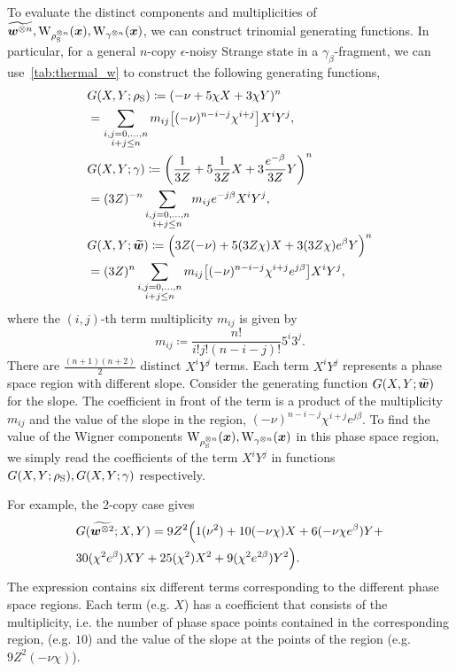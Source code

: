 \documentclass[pra,
aps,
twocolumn,
superscriptaddress,
groupedaddress,
nofootinbib,
reprint
]{revtex4-1}
\begin{document}
To evaluate the distinct components and multiplicities of $\widetilde{\bmw\too{n}}, \W{\noisys\too{n}}(\bmx), \W{\gamma\too{n}}(\bmx)$, we can construct trinomial generating functions.
In particular, for a general $n$-copy $\epsilon$-noisy Strange state in a $\gamma_\beta$-fragment, we can use~\cref{tab:thermal_w} to construct the following generating functions,
\begin{align}
	&G(X,Y; \rho_{\rm{S}}) \coloneqq (-\nu + 5\chi X + 3\chi Y)^n \nonumber\\
	&= \sum\limits_{\substack{i,j = 0,\dots,n \\ i+j \leq n}} m_{ij} \big[(-\nu)^{n-i-j} \chi^{i+j} \big] X^i Y^j, \\
	&G(X,Y; \gamma) \coloneqq \left( \frac{1}{3Z} + 5\frac{1}{3Z} X + 3 \frac{e^{-\beta}}{3Z} Y \right)^n \nonumber\\
	&= (3Z)^{-n} \sum\limits_{\substack{i,j = 0,\dots,n \\ i+j \leq n}} m_{ij} e^{-j\beta} X^i Y^j, \\
	&G(X,Y; \widetilde{\bm{w}}) \coloneqq \Big( 3Z(-\nu) + 5(3Z\chi) X + 3(3Z\chi) e^\beta Y \Big)^n \nonumber\\
	&= (3Z)^n \sum\limits_{\substack{i,j = 0,\dots,n \\ i+j \leq n}} m_{ij} \big[(-\nu)^{n-i-j} \chi^{i+j} e^{j\beta} \big] X^i Y^j,
\end{align}
where the $(i,j)$-th term multiplicity $m_{ij}$ is given by
\begin{equation}
	m_{ij} \coloneqq \frac{n!}{i!j!(n-i-j)!} 5^i 3^j.
\end{equation}
There are $\frac{(n+1)(n+2)}{2}$ distinct $X^i Y^j$ terms. 
Each term $X^i Y^j$ represents a phase space region with different slope. 
Consider the generating function $G(X,Y;\widetilde{\bm{w}})$ for the slope. 
The coefficient in front of the term is a product of the multiplicity $m_{ij}$ and the value of the slope in the region, $(-\nu)^{n-i-j} \chi^{i+j} e^{j\beta}$.
To find the value of the Wigner components $\W{\noisys\too{n}}(\bmx), \W{\gamma\too{n}}(\bmx)$ in this phase space region, we simply read the coefficients of the term $X^i Y^j$ in functions $G(X,Y; \rho_{\rm{S}}), G(X,Y; \gamma)$ respectively.

For example, the 2-copy case gives
\begin{equation}
	\begin{split}
	&G(\widetilde{\bm{w}^{\otimes 2}}; X,Y) = 9Z^2 \Big( 1(\nu^2) + 10(-\nu \chi)X + 6(-\nu \chi e^\beta) Y + \\
	&30 (\chi^2 e^\beta) XY + 25(\chi^2)X^2 + 9(\chi^2 e^{2\beta})Y^2 \Big).
	\end{split}
\end{equation}
The expression contains six different terms corresponding to the different phase space regions.
Each term (e.g. $X$) has a coefficient that consists of the multiplicity, i.e. the number of phase space points contained in the corresponding region, (e.g. $10$) and the value of the slope at the points of the region (e.g. $9Z^2(-\nu \chi)$).
\end{document}

